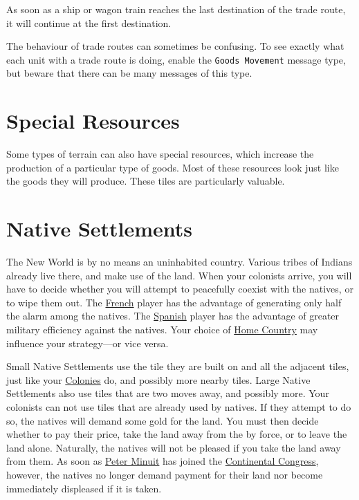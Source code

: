 \documentclass[12pt]{book}
\begin{document}
As soon as a ship or wagon train reaches the last destination of the
trade route, it will continue at the first destination.

The behaviour of trade routes can sometimes be confusing.  To see
exactly what each unit with a trade route is doing, enable the
\texttt{Goods Movement} message type, but beware that there can be
many messages of this type.

\hypertarget{Resources}{\section{Special Resources}}

Some types of terrain can also have special resources, which increase
the production of a particular type of goods. Most of these resources
look just like the goods they will produce. These tiles are
particularly valuable.


\hypertarget{Native Settlements}{\section{Native Settlements}}

The New World is by no means an uninhabited country. Various tribes of
Indians already live there, and make use of the land. When your
colonists arrive, you will have to decide whether you will attempt to
peacefully coexist with the natives, or to wipe them out. The
\hyperlink{France}{French} player has the advantage of generating only
half the alarm among the natives. The \hyperlink{Spain}{Spanish}
player has the advantage of greater military efficiency against the
natives. Your choice of \hyperlink{Home Country}{Home Country} may
influence your strategy---or vice versa.

Small Native Settlements use the tile they are built on and all the
adjacent tiles, just like your \hyperlink{Colonies}{Colonies} do, and
possibly more nearby tiles. Large Native Settlements also use tiles
that are two moves away, and possibly more. Your colonists can not use
tiles that are already used by natives. If they attempt to do so, the
natives will demand some gold for the land. You must then decide
whether to pay their price, take the land away from the by force, or
to leave the land alone.  Naturally, the natives will not be pleased
if you take the land away from them. As soon as \hyperlink{Peter
  Minuit}{Peter Minuit} has joined the \hyperlink{Continental
  Congress}{Continental Congress}, however, the natives no longer
demand payment for their land nor become immediately displeased if it
is taken.
\end{document}
